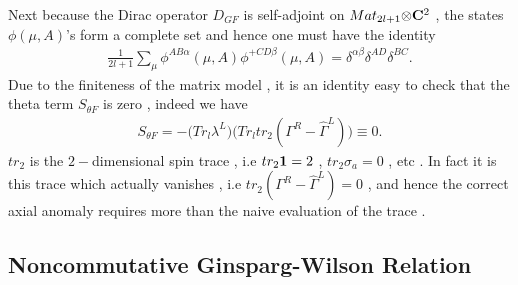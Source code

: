 \documentclass[a4paper,10pt]{article}
\begin{document}
Next because the Dirac operator $D_{GF}$ is self-adjoint on
$Mat_{2l+1}{\otimes}{\bf C}^2$ , the states ${\phi}(\mu,A)$'s form
a complete set and hence one must have the identity
\begin{eqnarray}
\frac{1}{2l+1}\sum_{\mu}{\phi}^{AB\alpha}(\mu,A){\phi}^{+CD\beta}(\mu,A)={\delta}^{\alpha
\beta}{\delta}^{AD}{\delta}^{BC}.\label{complete}
\end{eqnarray}
Due to the finiteness of the matrix model , it is an identity
easy to check   that the theta term ${S}_{\theta F}$ is zero ,
indeed we have
\begin{eqnarray}
S_{\theta
F}=-\bigg(Tr_l{\lambda}^L\bigg)\bigg(Tr_ltr_2({\Gamma}^R-\hat{\Gamma}^L)\bigg){\equiv}0.
\end{eqnarray}
$tr_2$ is the $2-$dimensional spin trace , i.e $tr_2{\bf 1}=2$ ,
$tr_2{\sigma}_a=0$ , etc . In fact it is this trace which actually
vanishes , i.e $tr_2({\Gamma}^R-\hat{\Gamma}^L)=0$ , and hence the
correct axial anomaly requires more than the naive evaluation of
the trace .




\subsection{Noncommutative Ginsparg-Wilson Relation }
\end{document}
